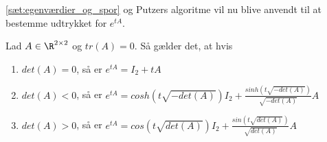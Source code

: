 \autoref{sæt:egenværdier_og_spor} og Putzers algoritme vil nu blive anvendt til at bestemme udtrykket for $e^{tA}$.

\begin{thmx} \textbf{} \label{e^tA_udtrykt_når_trA=0}%
\newline
Lad $A\in \R^{2 \times 2}$ og $tr(A)=0$. Så gælder det, at hvis
\begin{enumerate}
    \item $det(A)=0$, så er $e^{tA}=I_2+tA$
    \item $det(A)<0$, så er $e^{tA}=cosh\left(t\sqrt{-det(A)}\right)I_2+\frac{sinh\left(t\sqrt{-det(A)}\right)}{\sqrt{-det(A)}}A$
    \item $det(A)>0$, så er $e^{tA}=cos\left(t\sqrt{det(A)}\right)I_2+\frac{sin\left(t\sqrt{det(A)}\right)}{\sqrt{det(A)}}A$
\end{enumerate}
\end{thmx}


